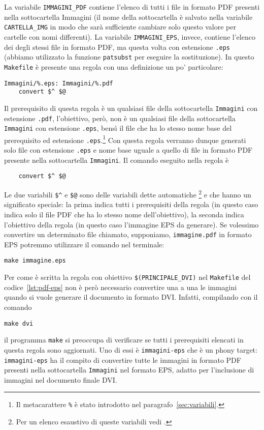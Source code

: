 La variabile \verb|IMMAGINI_PDF| contiene l'elenco di tutti i file in formato
\textsc{PDF} presenti nella sottocartella Immagini (il nome della sottocartella
è salvato nella variabile \verb|CARTELLA_IMG| in modo che sarà sufficiente
cambiare solo questo valore per cartelle con nomi differenti).  La variabile
\verb|IMMAGINI_EPS|, invece, contiene l'elenco dei degli stessi file in formato
\textsc{PDF}, ma questa volta con estensione \verb|.eps| (abbiamo utilizzato la
funzione \verb|patsubst| per eseguire la sostituzione).  In questo
\verb|Makefile| è presente una regola con una definizione un po' particolare:
\begin{lstlisting}
Immagini/%.eps: Immagini/%.pdf
	convert $^ $@
\end{lstlisting}
Il prerequisito di questa regola è un qualsiasi file della sottocartella
\verb|Immagini| con estensione \verb|.pdf|, l'obiettivo, però, non è un
qualsiasi file della sottocartella \verb|Immagini| con estensione \verb|.eps|,
bensì il file che ha lo stesso nome base del prerequisito ed estensione
\verb|.eps|.\footnote{Il metacarattere \texttt{\%} è stato introdotto nel
  paragrafo~\ref{sec:variabili}.}
Con questa regola verranno dunque generati solo file con estensione \verb|.eps|
e nome base uguale a quello di file in formato \textsc{PDF} presente nella
sottocartella \verb|Immagini|.  Il comando eseguito nella regola è
\begin{lstlisting}
	convert $^ $@
\end{lstlisting}
Le due variabili \verb|$^| e \verb|$@| sono delle variabili dette automatiche%
\footnote{Per un elenco esaustivo di queste variabili vedi
  \textcite[112]{gnu:make}.}
e che hanno un significato speciale: la prima indica tutti i prerequisiti della
regola (in questo caso indica solo il file \textsc{PDF} che ha lo stesso nome
dell'obiettivo), la seconda indica l'obiettivo della regola (in questo caso
l'immagine \textsc{EPS} da generare).  Se volessimo convertire un determinato
file chiamato, supponiamo, \verb|immagine.pdf| in formato \textsc{EPS} potremmo
utilizzare il comando nel terminale:
\begin{verbatim}
make immagine.eps
\end{verbatim}
Per come è scritta la regola con obiettivo \verb|$(PRINCIPALE_DVI)|
nel \verb|Makefile| del codice~\ref{lst:pdf-eps} non è però necessario
convertire una a una le immagini quando si vuole generare il documento in
formato \textsc{DVI}.  Infatti, compilando con il comando
\begin{verbatim}
make dvi
\end{verbatim}
il programma \verb|make| si preoccupa di verificare se tutti i prerequisiti
elencati in questa regola sono aggiornati.  Uno di essi è \verb|immagini-eps|
che è un phony target: \verb|immagini-eps| ha il compito di convertire tutte le
immagini in formato \textsc{PDF} presenti nella sottocartella \verb|Immagini|
nel formato \textsc{EPS}, adatto per l'inclusione di immagini nel documento
finale \textsc{DVI}.

